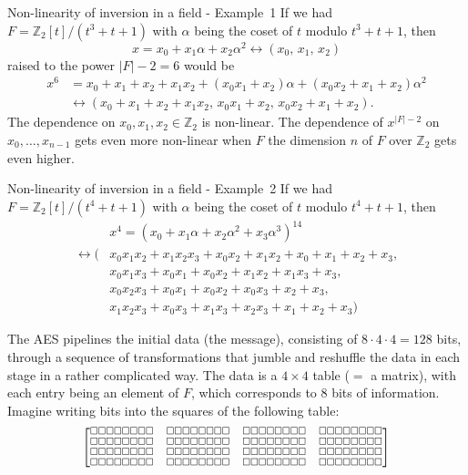 \documentclass{beamer}
\newcommand{\Z}{\mathbb{Z}}
\begin{document}
\begin{frame}{Non-linearity of inversion in a field - Example~1} 
	If we had $F = \Z_2[t] / (t^3 + t+1)$ with $\alpha$ being the coset of $t$ modulo $t^3 + t+1$, then 
	\[
		x = x_0 + x_1 \alpha  + x_2 \alpha^2 \leftrightarrow (x_0,\,x_1,\,x_2)
	\] raised to the power $|F|-2 = 6$ would be 
	\begin{align*} 
		x^6 & = x_0 + x_1 + x_2 + x_1 x_2 + (x_0 x_1 + x_2) \alpha + (x_0 x_2 + x_1 + x_2) \alpha^2
		\\ & \leftrightarrow (x_0 + x_1 + x_2 + x_1 x_2, \, x_0 x_1 + x_2, \, x_0 x_2 + x_1 + x_2). 
	\end{align*} 
	The dependence on $x_0, x_1, x_2 \in \Z_2$ is non-linear. The dependence of $x^{|F|-2}$ on $x_0,\ldots,x_{n-1}$ gets even more non-linear when $F$ the dimension $n$ of $F$ over $\Z_2$ gets even higher. 
\end{frame} 

\begin{frame}{Non-linearity of inversion in a field - Example~2}
	If we had $F = \Z_2[t] / (t^4 + t+1)$ with $\alpha$ being the coset of $t$ modulo $t^4 + t+1$, then 
	\begin{align*} 
		 & x^4 = (x_0  + x_1 \alpha + x_2 \alpha^2 + x_3 \alpha^3)^{14}  
		\\  \leftrightarrow ( & x_{0} x_{1} x_{2} + x_{1} x_{2} x_{3} + x_{0} x_{2} + x_{1} x_{2} + x_{0} + x_{1} + x_{2} + x_{3},
		\\ & x_{0} x_{1} x_{3} + x_{0} x_{1} + x_{0} x_{2} + x_{1} x_{2} + x_{1} x_{3} + x_{3},
		\\ & x_{0} x_{2} x_{3} + x_{0} x_{1} + x_{0} x_{2} + x_{0} x_{3} + x_{2} + x_{3}, 
		\\ & x_{1} x_{2} x_{3} + x_{0} x_{3} + x_{1} x_{3} + x_{2} x_{3} + x_{1} + x_{2} + x_{3} )
	\end{align*} 
\end{frame} 

\newcommand{\byte}{\square\square\square\square\square\square\square\square} 
\begin{frame}{}
	The AES pipelines the initial data (the message), consisting of $8 \cdot 4 \cdot 4 = 128$ bits, through a sequence of transformations that jumble and reshuffle the data in each stage in a rather complicated way. The data is a $4 \times 4$ table ($=$ a matrix), with each entry being an element of $F$, which corresponds to $8$ bits of information. Imagine writing bits into the squares of the following table: 
	\[ \scriptsize 
	\begin{bmatrix} 
		\byte & \byte & \byte & \byte \\
		\byte & \byte & \byte & \byte \\
		\byte & \byte & \byte & \byte \\
		\byte & \byte & \byte & \byte 		
	\end{bmatrix} 
	\]
\end{frame} 
\end{document}
